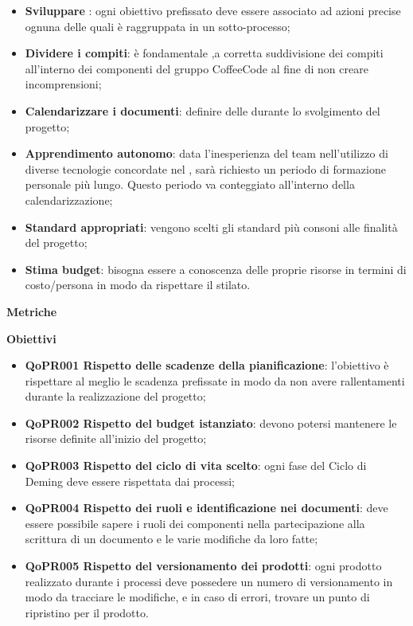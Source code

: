 \documentclass[../piano-di-qualifica.tex]{subfiles}
\begin{document}
\begin{itemize}
    \item \textbf{Sviluppare }: ogni obiettivo prefissato deve essere associato ad azioni precise ognuna delle quali è raggruppata in un sotto-processo;
    \item \textbf{Dividere i compiti}: è fondamentale ,a corretta suddivisione dei compiti all'interno dei componenti del gruppo CoffeeCode al fine di non creare incomprensioni;
    \item \textbf{Calendarizzare i documenti}: definire delle  durante lo svolgimento del progetto;
    \item \textbf{Apprendimento autonomo}: data l'inesperienza del team nell'utilizzo di diverse tecnologie concordate nel , sarà richiesto un periodo di formazione personale più lungo. Questo periodo va conteggiato all'interno della calendarizzazione;
    \item \textbf{Standard appropriati}: vengono scelti gli standard più consoni alle finalità del progetto;
    \item \textbf{Stima budget}: bisogna essere a conoscenza delle proprie risorse in termini di costo/persona in modo da rispettare il  stilato.
\end{itemize}

\textbf{Metriche}

\textbf{Obiettivi}
\begin{itemize}
    \item \textbf{QoPR001 Rispetto delle scadenze della pianificazione}: l'obiettivo è rispettare al meglio le scadenza prefissate in modo da non avere rallentamenti durante la realizzazione del progetto;
    \item \textbf{QoPR002 Rispetto del budget istanziato}: devono potersi mantenere le risorse definite all'inizio del progetto;
    \item \textbf{QoPR003 Rispetto del ciclo di vita scelto}: ogni fase del Ciclo di Deming deve essere rispettata dai processi;
    \item \textbf{QoPR004 Rispetto dei ruoli e identificazione nei documenti}: deve essere possibile sapere i ruoli dei componenti nella partecipazione alla scrittura di un documento e le varie modifiche da loro fatte;
    \item \textbf{QoPR005 Rispetto del versionamento dei prodotti}: ogni prodotto realizzato durante i processi deve possedere un numero di versionamento in modo da tracciare le modifiche, e in caso di errori, trovare un punto di ripristino per il prodotto.
\end{itemize}
\end{document}
